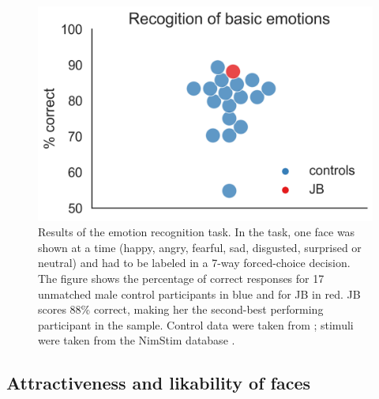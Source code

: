 \documentclass[fleqn,10pt]{SelfArx} %
\begin{document}
\begin{figure}[htbp]
	
	\renewcommand{\familydefault}{\sfdefault}\normalfont
	\centering
	\includegraphics[width=\columnwidth]{../reports/figures/emofaces_main_figure.png}
	\vspace*{-3mm}
 		\caption{Results of the emotion recognition task. In the task, one face was shown at a time (happy, angry, fearful, sad, disgusted, surprised or neutral) and had to be labeled in a 7-way forced-choice decision. The figure shows the percentage of correct responses for 17 unmatched male control participants in blue and for JB in red. JB scores 88\% correct, making her the second-best performing participant in the sample. Control data were taken from \citet{Wegrzyn_2017}; stimuli were taken from the NimStim database \citep{Tottenham_2009}.}%
	\label{fig:emo}
	
\end{figure}

 

\subsection*{Attractiveness and likability of faces}
\end{document}
